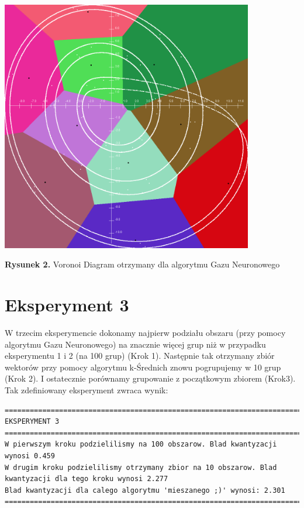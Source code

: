 \documentclass{classrep}
\begin{document}
\begin{center}
	\includegraphics[height=11cm]{gazNeuronowy.png}
	
	
	\textbf{Rysunek 2.} Voronoi Diagram otrzymany dla algorytmu Gazu Neuronowego
\end{center}

\section{Eksperyment 3}

W trzecim eksperymencie dokonamy najpierw podziału obszaru (przy pomocy algorytmu Gazu Neuronowego) na znacznie więcej grup niż w przypadku eksperymentu 1 i 2 (na 100 grup) (Krok 1). Następnie tak otrzymany zbiór wektorów przy pomocy algorytmu k-Średnich znowu pogrupujemy w 10 grup (Krok 2). I ostatecznie porównamy grupowanie z początkowym zbiorem (Krok3). Tak zdefiniowany eksperyment zwraca wynik:

\scriptsize
\begin{verbatim}
=====================================================================================================
EKSPERYMENT 3
=====================================================================================================
W pierwszym kroku podzielilismy na 100 obszarow. Blad kwantyzacji wynosi 0.459
W drugim kroku podzielilismy otrzymany zbior na 10 obszarow. Blad kwantyzacji dla tego kroku wynosi 2.277
Blad kwantyzacji dla calego algorytmu 'mieszanego ;)' wynosi: 2.301
=====================================================================================================
\end{verbatim}
\normalsize
\end{document}
